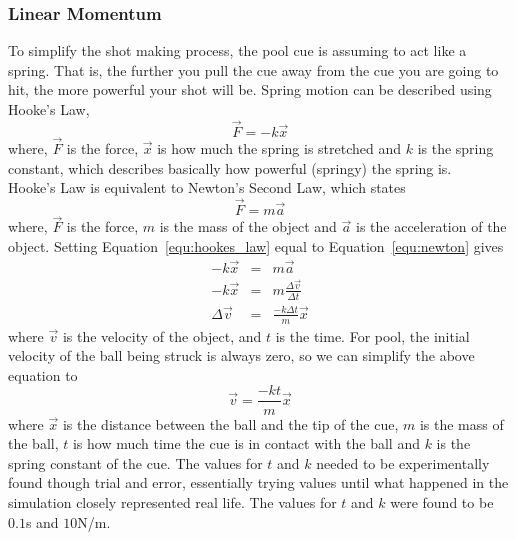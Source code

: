 \documentclass[12pt]{article}
\begin{document}
            \subsubsection{Linear Momentum}
            To simplify the shot making process, the pool cue is assuming to act like a spring. That is, the further you pull
            the cue away from the cue you are going to hit, the more powerful your shot will be. Spring motion can be described
            using Hooke's Law,
            \begin{equation}
                \vec F = -k \vec x
                \label{equ:hookes_law}
            \end{equation}
            where, $\vec F$ is the force, $\vec x$ is how much the spring is stretched and $k$ is the spring constant, which
            describes basically how powerful (springy) the spring is.
            \\
            Hooke's Law is equivalent to Newton's Second Law, which states
            \begin{equation}
                \vec F = m \vec a
                \label{equ:newton}
            \end{equation}
            where, $\vec F$ is the force, $m$ is the mass of the object and $\vec a$ is the acceleration of the object. Setting
            Equation~\ref{equ:hookes_law} equal to Equation~\ref{equ:newton} gives
            \begin{eqnarray}
                -k \vec x &=& m \vec a \nonumber \\
                -k \vec x &=& m \frac{\Delta \vec v}{\Delta t} \nonumber \\
                \Delta \vec v &=& \frac{-k \Delta t}{m}\vec x  \nonumber
            \end{eqnarray}
            where $\vec v$ is the velocity of the object, and $t$ is the time. For pool, the initial velocity of the ball being struck is
            always zero, so we can simplify the above equation to
            \begin{equation}
                \vec v = \frac{-k t}{m}\vec x
                \label{equ:shot_velocity}
            \end{equation}
            where $\vec x$ is the distance between the ball and the tip of the cue, $m$ is the mass of the ball, $t$ is how much time the
            cue is in contact with the ball and $k$ is the spring constant of the cue. The values for $t$ and $k$ needed to be experimentally
            found though trial and error, essentially trying values until what happened in the simulation closely represented real life. The
            values for $t$ and $k$ were found to be $0.1$s and $10$N/m.
            
\end{document}
